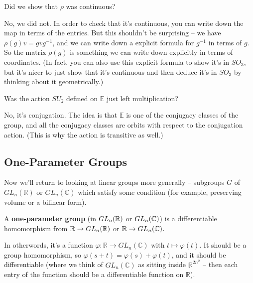\begin{question}
Did we show that $\rho$ was continuous?
\end{question}

\begin{ans}
No, we did not. In order to check that it's continuous, you can write down the map in terms of the entries. But this shouldn't be surprising -- we have $\rho(g)v = gvg^{-1}$, and we can write down a explicit formula for $g^{-1}$ in terms of $g$. So the matrix $\rho(g)$ is something we can write down explicitly in terms of coordinates. (In fact, you can also use this explicit formula to show it's in $SO_3$, but it's nicer to just show that it's continuous and then deduce it's in $SO_3$ by thinking about it geometrically.)
\end{ans}

\begin{question}
Was the action $SU_2$ defined on $\mathbb{E}$ just left multiplication?
\end{question}

\begin{ans}
No, it's conjugation. The idea is that $\mathbb{E}$ is one of the conjugacy classes of the group, and all the conjugacy classes are orbits with respect to the conjugation action. (This is why the action is transitive as well.)
\end{ans}


\subsection{One-Parameter Groups}

Now we'll return to looking at linear groups more generally -- subgroups $G$ of $GL_n(\mathbb{R})$ or $GL_n(\mathbb{C})$ which satisfy some condition (for example, preserving volume or a bilinear form). 

\begin{definition}
A \textbf{one-parameter group} (in $GL_n(\mathbb R)$ or $GL_n(\mathbb C)$) is a differentiable homomorphism from $\mathbb R \to GL_n(\mathbb R)$ or $\mathbb R \to GL_n(\mathbb C).$
\end{definition}

In otherwords, it's a function $\varphi : \mathbb{R} \to GL_n(\mathbb{C})$ with $t \mapsto \varphi(t)$. It should be a group homomorphism, so $\varphi(s + t) = \varphi(s) + \varphi(t)$, and it should be differentiable (where we think of $GL_n(\mathbb{C})$ as sitting inside $\mathbb{R}^{2n^2}$ -- then each entry of the function should be a differentiable function on $\mathbb{R}$). 

